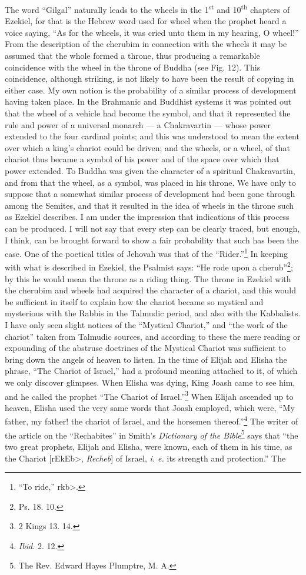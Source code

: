 \documentclass[a4paper, 11pt, oneside, polutonikogreek, english]{article}
\begin{document}
The word ``Gilgal'' naturally leads to the wheels in the 1\textsuperscript{st} and 10\textsuperscript{th} chapters of Ezekiel, for that is the Hebrew word used for wheel when the prophet heard a voice saying, ``As for the wheels, it was cried unto them in my hearing, O wheel!'' From the description of the cherubim in connection with the wheels it may be assumed that the whole formed a throne, thus producing a remarkable coincidence with the wheel in the throne of Buddha (see Fig. 12). This coincidence, although striking, is not likely to have been the result of copying in either case. My own notion is the probability of a similar process of development having taken place. In the Brahmanic and Buddhist systems it was pointed out that the wheel of a vehicle had become the symbol, and that it represented the rule and power of a universal monarch --- a Chakravartin --- whose power extended to the four cardinal points; and this was understood to mean the extent over which a king's chariot could be driven; and the wheels, or a wheel, of that chariot thus became a symbol of his power and of the space over which that power extended. To Buddha was given the character of a spiritual Chakravartin, and from that the wheel, as a symbol, was placed in his throne. We have only to suppose that a somewhat similar process of development had been gone through among the Semites, and that it resulted in the idea of wheels in the throne such as Ezekiel describes. I am under the impression that indications of this process can be produced. I will not say that every step can be clearly traced, but enough, I think, can be brought forward to show a fair probability that such has been the case. One of the poetical titles of Jehovah was that of the ``Rider.''\footnote{``To ride,'' \<rkb>.} In keeping with what is described in Ezekiel, the Psalmist says: ``He rode upon a cherub''\footnote{Ps. 18. 10.}; by this he would mean the throne as a riding thing. The throne in Ezekiel with the cherubim and wheels had acquired the character of a chariot, and this would be sufficient in itself to explain how the chariot became so mystical and mysterious with the Rabbis in the Talmudic period, and also with the Kabbalists. I have only seen slight notices of the ``Mystical Chariot,'' and ``the work of the chariot'' taken from Talmudic sources, and according to these the mere reading or expounding of the abstruse doctrines of the Mystical Chariot was sufficient to bring down the angels of heaven to listen. In the time of Elijah and Elisha the phrase, ``The Chariot of Israel,'' had a profound meaning attached to it, of which we only discover glimpses. When Elisha was dying, King Joash came to see him, and he called the prophet ``The Chariot of Israel.''\footnote{2 Kings 13. 14.} When Elijah ascended up to heaven, Elisha used the very same words that Joash employed, which were, ``My father, my father! the chariot of Israel, and the horsemen thereof.''\footnote{\emph{Ibid.} 2. 12.} The writer of the article on the ``Rechabites'' in Smith's \emph{Dictionary of the Bible}\footnote{The Rev. Edward Hayes Plumptre, M. A.} says that ``the two great prophets, Elijah and Elisha, were known, each of them in his time, as the Chariot [\<rEkEb>, \emph{Recheb}] of Israel, \emph{i. e.} its strength and protection.'' The 
\end{document}
